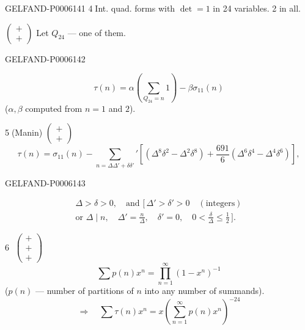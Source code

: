 \begin{GelfandAdjacentEvidence}{GELFAND-P000614}{1}
\textcircled{\scriptsize 4}\quad Int. quad. forms with \(\det=1\) in 24 variables.
\hfill 2 in all.

\(\left(\begin{smallmatrix}+\\+\end{smallmatrix}\right)\)
\qquad Let \(Q_{24}\) — one of them.
\end{GelfandAdjacentEvidence}
\begin{GelfandAdjacentEvidence}{GELFAND-P000614}{2}

\[
\tau(n)=\alpha\left(\sum_{Q_{24}=n}1\right)-\beta\sigma_{11}(n)
\]
(\(\alpha,\beta\) computed from \(n=1\) and \(2\)).

\textcircled{\scriptsize 5}\quad (Manin)
\hspace{1em}\(\left(\begin{smallmatrix}+\\+\end{smallmatrix}\right)\)
\[
\tau(n)=\sigma_{11}(n)-\sum_{n=\Delta\Delta'+\delta\delta'}'
\left[(\Delta^8\delta^2-\Delta^2\delta^8)
+\frac{691}{6}(\Delta^6\delta^4-\Delta^4\delta^6)\right],
\]
\end{GelfandAdjacentEvidence}
\begin{GelfandAdjacentEvidence}{GELFAND-P000614}{3}

\[
\begin{gathered}
\Delta>\delta>0,\quad\text{and }\bigl[\,\Delta'>\delta'>0\quad(\text{integers})\\
\text{or }\Delta\mid n,\quad \Delta'=\frac n\Delta,\quad
\delta'=0,\quad0<\frac\delta\Delta\le\frac12\,\bigr].
\end{gathered}
\]

\textcircled{\scriptsize 6}\quad
\(\left(\begin{smallmatrix}+\\+\\+\end{smallmatrix}\right)\)
\[
\sum p(n)x^n=\prod_{n=1}^\infty(1-x^n)^{-1}
\]
(\(p(n)\) — number of partitions of \(n\) into any number of summands).
\[
\Rightarrow\quad \sum\tau(n)x^n=x\left(\sum_{n=1}^{\infty}p(n)x^n\right)^{-24}
\]
\end{GelfandAdjacentEvidence}
